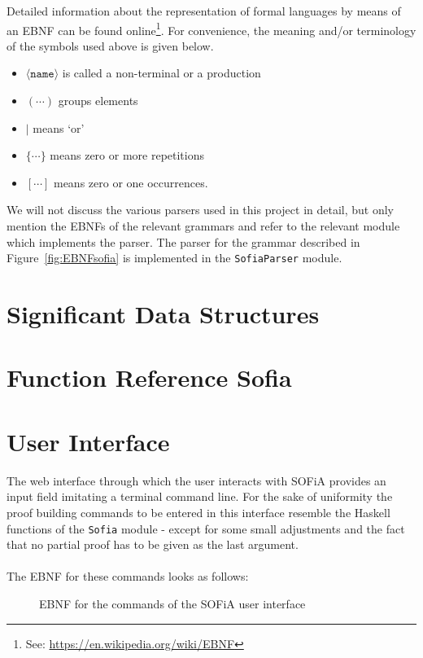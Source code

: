 \documentclass[notitlepage]{report}
\newcommand\m[1]{\texttt{#1}}
\begin{document}
Detailed information about the representation of formal languages by means of an
EBNF can be found online\footnote{%
See: \url{https://en.wikipedia.org/wiki/EBNF}}. For convenience,
the meaning and/or terminology of the symbols used above is given below.
\begin{multicols}{2}
\begin{itemize}
    \item $\langle\texttt{name}\rangle$ is called a non-terminal or a production
    \item $(\cdots)$ groups elements
    \item $|$ means `or'
    \item $\{\cdots\}$ means zero or more repetitions
    \item $[\cdots]$ means zero or one occurrences.
\end{itemize}
\end{multicols}

We will not discuss the various parsers used in this project in detail, but only
mention the EBNFs of the relevant grammars and refer to the relevant module
which implements the parser. The parser for the grammar described in
Figure~\ref{fig:EBNFsofia} is implemented in the \m{SofiaParser} module.

\chapter{Significant Data Structures}


\chapter{Function Reference Sofia}


\chapter{User Interface}
The web interface through which the user interacts with SOFiA provides an input
field imitating a terminal command line. For the sake of uniformity the proof
building commands to be entered in this interface resemble the Haskell functions
of the \m{Sofia} module - except for some small adjustments and the fact that no
partial proof has to be given as the last argument.
\\\\
The EBNF for these commands looks as follows:
\begin{figure}[h!]
    {\renewcommand{\arraystretch}{2.0}
    }
    \caption{EBNF for the commands of the SOFiA
             user interface}\label{fig:EBNFcmds}
\end{figure}
\end{document}
